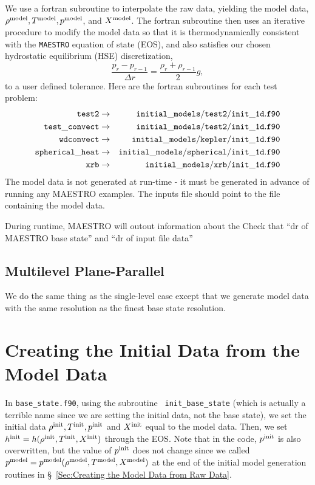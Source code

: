 We use a fortran subroutine
to interpolate the raw data, yielding the model data, $\rho^{\rm model},
T^{\rm model}, p^{\rm model}$, and $X^{\rm model}$.  The fortran subroutine
then uses an iterative procedure to modify the model data so that it
is thermodynamically consistent with the {\tt MAESTRO} equation of
state (EOS), and also satisfies our chosen hydrostatic equilibrium
(HSE) discretization,
\begin{equation}
\frac{p_r - p_{r-1}}{\Delta r} = \frac{\rho_r + \rho_{r-1}}{2}g,\label{HSE Discretization}
\end{equation}
to a user defined tolerance.  Here are the fortran subroutines for each test problem:
\begin{eqnarray}
{\tt test2} & \rightarrow & {\tt initial\_models/test2/init\_1d.f90} \nonumber \\
{\tt test\_convect} & \rightarrow & {\tt initial\_models/test2/init\_1d.f90} \nonumber \\
{\tt wdconvect} & \rightarrow & {\tt initial\_models/kepler/init\_1d.f90} \nonumber \\
{\tt spherical\_heat} & \rightarrow & {\tt initial\_models/spherical/init\_1d.f90} \nonumber \\
{\tt xrb} & \rightarrow & {\tt initial\_models/xrb/init\_1d.f90} \nonumber
\end{eqnarray}
The model data is not generated at run-time - it must be generated in
advance of running any MAESTRO examples.  The inputs file should point
to the file containing the model data.

During runtime, MAESTRO will outout information about the Check that ``dr of MAESTRO base state'' and ``dr of input file data''

\subsection{Multilevel Plane-Parallel}
We do the same thing as the single-level case except that we generate
model data with the same resolution as the finest base state
resolution.


\section{Creating the Initial Data from the Model Data}
In {\tt base\_state.f90}, using the subroutine {\tt
  init\_base\_state} (which is actually a terrible name since we
are setting the initial data, not the base state), we set the initial
data $\rho^{\rm init}, T^{\rm init}, p^{\rm init}$ and $X^{\rm init}$ equal to the
model data.  Then, we set $h^{\rm init} =
h(\rho^{\rm init},T^{\rm init},X^{\rm init})$ through the EOS.  Note that in the code,
$p^{\rm init}$ is also overwritten, but the value of $p^{\rm init}$ does not
change since we called $p^{\rm model} =
p^{\rm model}(\rho^{\rm model},T^{\rm model},X^{\rm model})$ at the end of the
initial model generation routines in \S~\ref{Sec:Creating the Model Data from Raw
  Data}.

